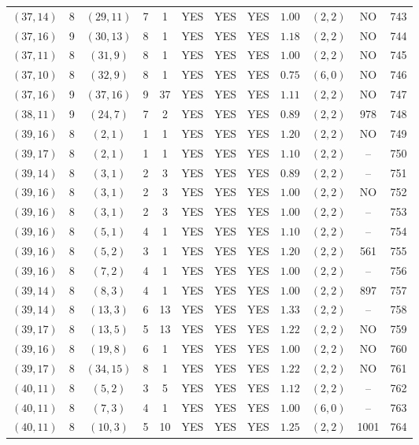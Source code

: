 \begin{longtable}{|c|c|c|c|c|c|c|c|c|c|c|c|}
$(37,14)$ & 8 & $(29,11)$ & 7 & 1 & YES & YES & YES & $1.00$ & $(2,2)$ & NO & 743\\
$(37,16)$ & 9 & $(30,13)$ & 8 & 1 & YES & YES & YES & $1.18$ & $(2,2)$ & NO & 744\\
$(37,11)$ & 8 & $(31,9)$ & 8 & 1 & YES & YES & YES & $1.00$ & $(2,2)$ & NO & 745\\
$(37,10)$ & 8 & $(32,9)$ & 8 & 1 & YES & YES & YES & $0.75$ & $(6,0)$ & NO & 746\\
$(37,16)$ & 9 & $(37,16)$ & 9 & 37 & YES & YES & YES & $1.11$ & $(2,2)$ & NO & 747\\
$(38,11)$ & 9 & $(24,7)$ & 7 & 2 & YES & YES & YES & $0.89$ & $(2,2)$ & 978 & 748\\
$(39,16)$ & 8 & $(2,1)$ & 1 & 1 & YES & YES & YES & $1.20$ & $(2,2)$ & NO & 749\\
$(39,17)$ & 8 & $(2,1)$ & 1 & 1 & YES & YES & YES & $1.10$ & $(2,2)$ & -- & 750\\
$(39,14)$ & 8 & $(3,1)$ & 2 & 3 & YES & YES & YES & $0.89$ & $(2,2)$ & -- & 751\\
$(39,16)$ & 8 & $(3,1)$ & 2 & 3 & YES & YES & YES & $1.00$ & $(2,2)$ & NO & 752\\
$(39,16)$ & 8 & $(3,1)$ & 2 & 3 & YES & YES & YES & $1.00$ & $(2,2)$ & -- & 753\\
$(39,16)$ & 8 & $(5,1)$ & 4 & 1 & YES & YES & YES & $1.10$ & $(2,2)$ & -- & 754\\
$(39,16)$ & 8 & $(5,2)$ & 3 & 1 & YES & YES & YES & $1.20$ & $(2,2)$ & 561 & 755\\
$(39,16)$ & 8 & $(7,2)$ & 4 & 1 & YES & YES & YES & $1.00$ & $(2,2)$ & -- & 756\\
$(39,14)$ & 8 & $(8,3)$ & 4 & 1 & YES & YES & YES & $1.00$ & $(2,2)$ & 897 & 757\\
$(39,14)$ & 8 & $(13,3)$ & 6 & 13 & YES & YES & YES & $1.33$ & $(2,2)$ & -- & 758\\
$(39,17)$ & 8 & $(13,5)$ & 5 & 13 & YES & YES & YES & $1.22$ & $(2,2)$ & NO & 759\\
$(39,16)$ & 8 & $(19,8)$ & 6 & 1 & YES & YES & YES & $1.00$ & $(2,2)$ & NO & 760\\
$(39,17)$ & 8 & $(34,15)$ & 8 & 1 & YES & YES & YES & $1.22$ & $(2,2)$ & NO & 761\\
$(40,11)$ & 8 & $(5,2)$ & 3 & 5 & YES & YES & YES & $1.12$ & $(2,2)$ & -- & 762\\
$(40,11)$ & 8 & $(7,3)$ & 4 & 1 & YES & YES & YES & $1.00$ & $(6,0)$ & -- & 763\\
$(40,11)$ & 8 & $(10,3)$ & 5 & 10 & YES & YES & YES & $1.25$ & $(2,2)$ & 1001 & 764\\

\end{longtable}
